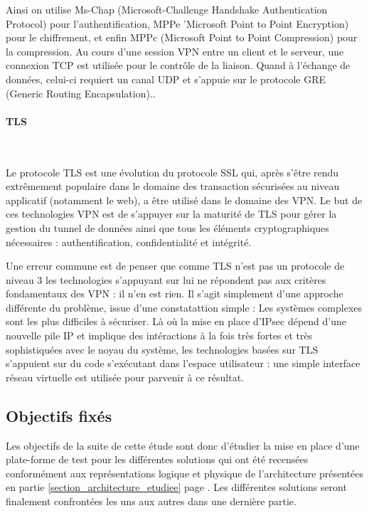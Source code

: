 Ainsi on utilise Ms-Chap (Microsoft-Challenge Handshake Authentication Protocol) pour l'authentification, MPPe 'Microsoft Point to Point Encryption) pour le chiffrement, et enfin MPPc (Microsoft Point to Point Compression) pour la compression. Au cours d'une session VPN entre un client et le serveur, une connexion TCP est utilisée pour le contrôle de la liaison. Quand à l'échange de données, celui-ci requiert un canal UDP et s'appuie sur le protocole GRE (Generic Routing Encapsulation)..


\paragraph{TLS}
~

Le protocole TLS est une évolution du protocole SSL qui, après s'être rendu extrêmement populaire dans le domaine des transaction sécurisées au niveau applicatif (notamment le web), a être utilisé dans le domaine des VPN. Le but de ces technologies VPN est de s'appuyer sur la maturité de TLS pour gérer la gestion du tunnel de données ainsi que tous les éléments cryptographiques nécessaires : authentification, confidentialité et intégrité.

Une erreur commune est de penser que comme TLS n'est pas un protocole de niveau 3 les technologies s'appuyant sur lui ne répondent pas aux critères fondamentaux des VPN : il n'en est rien. Il s'agit simplement d'une approche différente du problème, issue d'une constatattion simple : Les systèmes complexes sont les plus difficiles à sécuriser. Là où la mise en place d'IPsec dépend d'une nouvelle pile IP et implique des intéractions à la fois très fortes et très sophistiquées avec le noyau du système, les technologies basées sur TLS s'appuient sur du code s'exécutant dans l'espace utilisateur : une simple interface réseau virtuelle est utilisée pour parvenir à ce résultat.


\subsection{Objectifs fixés}

Les objectifs de la suite de cette étude sont donc d'étudier la mise en place d'une plate-forme de test pour les différentes solutions qui ont été recensées conformément aux représentations logique et physique de l'architecture présentées en partie \ref{section_architecture_etudiee} page \pageref{section_architecture_etudiee}. Les différentes solutions seront finalement confrontées les uns aux autres dans une dernière partie.


